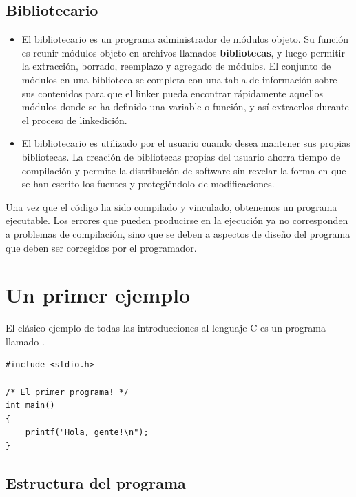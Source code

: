 \subsection{Bibliotecario}
\begin{itemize}
	\item El bibliotecario es un programa administrador de módulos objeto. Su función
es reunir módulos objeto en archivos llamados \textbf{bibliotecas}, y luego
permitir la extracción, borrado, reemplazo y agregado de módulos.
El conjunto de módulos en una biblioteca se completa con una tabla de
información sobre sus contenidos para que el linker pueda encontrar
rápidamente aquellos módulos donde se ha definido una variable o
función, y así extraerlos durante el proceso de linkedición. 
\item El bibliotecario es utilizado por el usuario cuando desea mantener sus
propias bibliotecas. La creación de bibliotecas propias del usuario
ahorra tiempo de compilación y permite la distribución de software
sin revelar la forma en que se han escrito los fuentes y
protegiéndolo de modificaciones. 
\end{itemize}

Una vez que el código ha sido compilado y vinculado, obtenemos un programa ejecutable. Los errores que pueden producirse en la ejecución ya no corresponden a problemas de compilación, sino que se deben a aspectos de diseño del programa que deben ser corregidos por el programador.

\section{Un primer ejemplo}

El clásico ejemplo de todas las introducciones al lenguaje C es un programa llamado .

\begin{lstlisting}
#include <stdio.h>

/* El primer programa! */
int main()
{
	printf("Hola, gente!\n");
}
\end{lstlisting}

\subsection{Estructura del programa}

